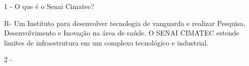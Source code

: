 1 - O que é o Senai Cimatec?

R- Um Instituto para desenvolver tecnologia de vanguarda e realizar Pesquisa, Desenvolvimento e Inovação na área de saúde. 
O SENAI CIMATEC estende limites de infraestrutura em um complexo tecnológico e industrial.

2 - 
